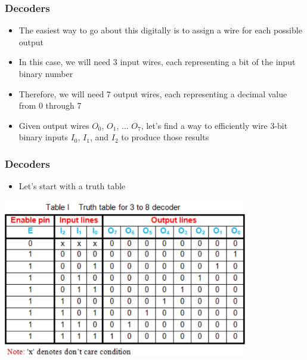 \documentclass{beamer}
\begin{document}
       	\begin{frame}
       		\frametitle{Decoders}
       		\begin{itemize}
       			\item The easiest way to go about this digitally is to assign a wire for each possible output
       			\item In this case, we will need 3 input wires, each representing a bit of the input binary number
       			\item Therefore, we will need 7 output wires, each representing a decimal value from 0 through 7
       			\item Given output wires $O_0$, $O_1$, ... $O_7$, let's find a way to efficiently wire 3-bit binary inputs $I_0$, $I_1$, and $I_2$ to produce those results
       		\end{itemize}
       			 
       	\end{frame}
       	
       	\begin{frame}
       		\frametitle{Decoders}
       		\begin{itemize}
       			\item Let's start with a truth table
       		\end{itemize}
       		
       		\centering
       		\includegraphics[width=0.8\textwidth]{decoder}
       	\end{frame}
       	
\end{document}

